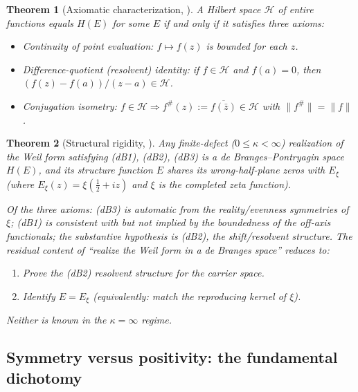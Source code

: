\documentclass[11pt]{amsart}
\newtheorem{theorem}{Theorem}[section]
\theoremstyle{definition}
\theoremstyle{remark}
\newcommand{\half}{\tfrac{1}{2}}
\newcommand{\kap}{\kappa}
\begin{document}
\begin{theorem}[Axiomatic characterization, \cite{dB88}]
A Hilbert space $\mathcal{H}$ of entire functions equals $H(E)$ for some $E$ if and
only if it satisfies three axioms:
\begin{itemize}
  \item[\textup{(dB1)}] Continuity of point evaluation: $f\mapsto f(z)$ is bounded
    for each $z$.
  \item[\textup{(dB2)}] Difference-quotient (resolvent) identity: if $f\in\mathcal{H}$
    and $f(a)=0$, then $(f(z)-f(a))/(z-a)\in\mathcal{H}$.
  \item[\textup{(dB3)}] Conjugation isometry: $f\in\mathcal{H} \Rightarrow
    f^\#(z):=\overline{f(\bar z)}\in\mathcal{H}$ with $\|f^\#\|=\|f\|$.
\end{itemize}
\end{theorem}

\begin{theorem}[Structural rigidity, \cite{RP25}]
\label{thm:rigidity}
Any finite-defect ($0\le\kap<\infty$) realization of the Weil form satisfying
(dB1), (dB2), (dB3) is a de Branges--Pontryagin space $H(E)$, and its structure
function $E$ shares its wrong-half-plane zeros with $E_\xi$ (where $E_\xi(z) =
\xi(\half+iz)$ and $\xi$ is the completed zeta function).

Of the three axioms: (dB3) is automatic from the reality/evenness symmetries of
$\xi$; (dB1) is consistent with but not implied by the boundedness of the off-axis
functionals; the substantive hypothesis is \textup{(dB2)}, the shift/resolvent structure.
The residual content of ``realize the Weil form in a de Branges space'' reduces to:
\begin{enumerate}[label=\upshape(\roman*)]
  \item Prove the (dB2) resolvent structure for the carrier space.
  \item Identify $E = E_\xi$ (equivalently: match the reproducing kernel of $\xi$).
\end{enumerate}
Neither is known in the $\kap=\infty$ regime.
\end{theorem}

\subsection{Symmetry versus positivity: the fundamental dichotomy}
\label{ss:sym-pos}
\end{document}
